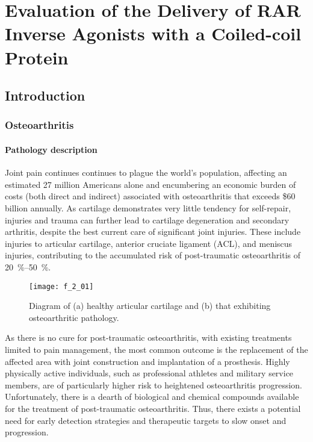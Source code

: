 \chapter{Evaluation of the Delivery of RAR Inverse Agonists with a Coiled-coil
Protein}

\begin{refsection}

\section{Introduction}

\subsection{Osteoarthritis}

\subsubsection{Pathology description}

Joint pain continues continues to plague the world's population, affecting an
estimated 27 million Americans alone and encumbering an economic burden of costs
(both direct and indirect) associated with osteoarthritis that exceeds \$60
billion annually.\cite{Brown} As cartilage demonstrates very little tendency for
self-repair, injuries and trauma can further lead to cartilage degeneration and
secondary arthritis, despite the best current care of significant joint
injuries.\cite{Helmerhorst2014} These include injuries to articular cartilage,
anterior cruciate ligament (ACL), and meniscus injuries, contributing to the
accumulated risk of post-traumatic osteoarthritis of
\SIrange{20}{50}{\percent}.\cite{Roos1995,Anderson2011,Reiersen1998,Buckwalter2006}
\begin{figure}[h!] \centering \texttt{[image: f\_2\_01]}
    \caption[Diagram of healthy articular cartilage and that exhibiting
    osteoarthritic pathology]{Diagram of (a) healthy articular cartilage and (b)
        that exhibiting osteoarthritic
        pathology.\cite{Wieland2005}}\label{fig:bone_diagram_1} \end{figure}
As there is no cure for post-traumatic osteoarthritis, with existing treatments
limited to pain management, the most common outcome is the replacement of the
affected area with joint construction and implantation of a prosthesis. Highly
physically active individuals, such as professional athletes and military
service members, are of particularly higher risk to heightened osteoarthritis
progression.\cite{Cameron2011} Unfortunately, there is a dearth of biological
and chemical compounds available for the treatment of post-traumatic
osteoarthritis. Thus, there exists a potential need for early detection
strategies and therapeutic targets to slow onset and progression.


\end{refsection}
